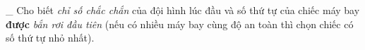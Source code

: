 \_ Cho biết   \emph{    chỉ số chắc chắn   }   của đội hình lúc đầu và số thứ tự của chiếc máy bay   \textbf{    được   }\emph{    bắn rơi đầu tiên   }   (nếu có nhiều máy bay cùng độ an toàn thì chọn chiếc có số thứ tự nhỏ nhất).